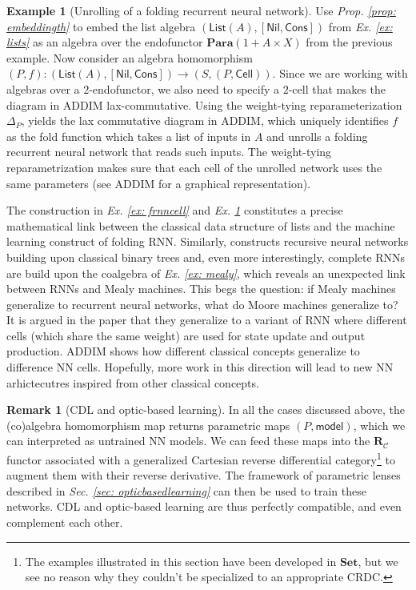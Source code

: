\documentclass[12pt,a4paper,openright,twoside]{report}
\theoremstyle{plain}
\theoremstyle{definition}
\newtheorem{remark}[proposition]{Remark}
\newtheorem{example}[proposition]{Example}
\begin{document}
\begin{example}[Unrolling of a folding recurrent neural network]
  \label{ex: frnnunroll}
  Use \textit{Prop. \ref{prop: embeddingth}} to embed the list algebra $(\mathsf{List}(A), [\mathsf{Nil}, \mathsf{Cons}])$ from \textit{Ex. \ref{ex: lists}} as an algebra over the endofunctor $\mathbf{Para}(1 + A \times X)$ from the previous example. Now consider an algebra homomorphism $(P,f): (\mathsf{List}(A), [\mathsf{Nil}, \mathsf{Cons}]) \to (S,(P,\mathsf{Cell}))$. Since we are working with algebras over a $2$-endofunctor, we also need to specify a $2$-cell that makes the diagram in ADDIM lax-commutative. Using the weight-tying reparameterization $\Delta_P$, yields the lax commutative diagram in ADDIM, which uniquely identifies $f$ as the fold function which takes a list of inputs in $A$ and unrolls a folding recurrent neural network that reads such inputs. The weight-tying reparametrization makes sure that each cell of the unrolled network uses the same parameters (see ADDIM for a graphical representation). 
\end{example}


The construction in  \textit{Ex. \ref{ex: frnncell}} and \textit{Ex. \ref{ex: frnnunroll}} constitutes a precise mathematical link between the classical data structure of lists and the machine learning construct of folding RNN. Similarly, \cite{gavranovicposition} constructs recursive neural networks building upon classical binary trees and, even more interestingly, complete RNNs are build upon the coalgebra of \textit{Ex. \ref{ex: mealy}}, which reveals an unexpected link between RNNs and Mealy machines. This begs the question: if Mealy machines generalize to recurrent neural networks, what do Moore machines generalize to? It is argued in the paper that they generalize to a variant of RNN where different cells (which share the same weight) are used for state update and output production. ADDIM shows how different classical concepts generalize to difference NN cells. Hopefully, more work in this direction will lead to new NN arhictecutres inspired from other classical concepts.

\begin{remark}[CDL and optic-based learning]
  In all the cases discussed above, the (co)algebra homomorphism map returns parametric maps $(P,\mathsf{model})$, which we can interpreted as untrained NN models. We can feed these maps into the $\mathbf{R}_{\mathcal{C}}$ functor associated with a generalized Cartesian reverse differential category\footnote{The examples illustrated in this section have been developed in $\mathbf{Set}$, but we see no reason why they couldn't be specialized to an appropriate CRDC.} to augment them with their reverse derivative. The framework of parametric lenses described in 
  \textit{Sec. \ref{sec: opticbasedlearning}} can then be used to train these networks. CDL and optic-based learning are thus perfectly compatible, and even complement each other.
\end{remark}
\end{document}
